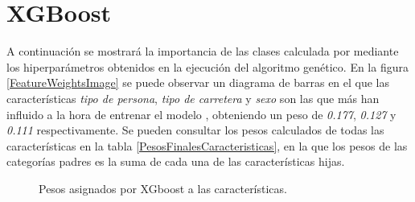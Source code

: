 \section{XGBoost}

  A continuación se mostrará la importancia de las clases calculada por  mediante los hiperparámetros obtenidos en la ejecución del algoritmo genético. En la figura \eqref{FeatureWeightsImage} se puede observar un diagrama de barras en el que las características \textit{tipo de persona}, \textit{tipo de carretera} y \textit{sexo} son las que más han influido a la hora de entrenar el modelo , obteniendo un peso de \textit{0.177}, \textit{0.127} y \textit{0.111} respectivamente. Se pueden consultar los pesos calculados de todas las características en la tabla \eqref{PesosFinalesCaracteristicas}, en la que los pesos de las categorías padres es la suma de cada una de las características hijas.

  \begin{figure}[H]
      \centering
      
      \caption{Pesos asignados por XGboost a las características.}
      \label{FeatureWeightsImage}
   \end{figure}


